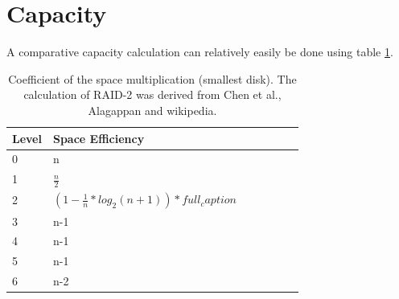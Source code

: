 \documentclass{article}
\begin{document}
\section{Capacity}
A comparative capacity calculation can relatively easily be done using table \ref{tab:capacity}.
\begin{table}[h]
    \begin{tabularx}{\textwidth}{l|X|X|X|X|X|X}
        \textbf{Level} &
        Space Efficiency \\
        \hline
        0 & n \\
        1 & \( \frac{n}{2}\)\\
        2 & \( (1-\frac{1}{n}*log_2(n+1))*full_caption \) \\
        3 & n-1 \\
        4 & n-1 \\
        5 & n-1 \\
        6 & n-2 \\
       \end{tabularx}
    \caption{Coefficient of the space multiplication (smallest disk). \cite{uw:raid} The calculation of RAID-2 was
    derived from Chen et al., Alagappan and wikipedia. \cite{cmu:raidhighperf}\cite{uw:raid}}
    \label{tab:capacity}
\end{table}
\pagebreak
\end{document}
